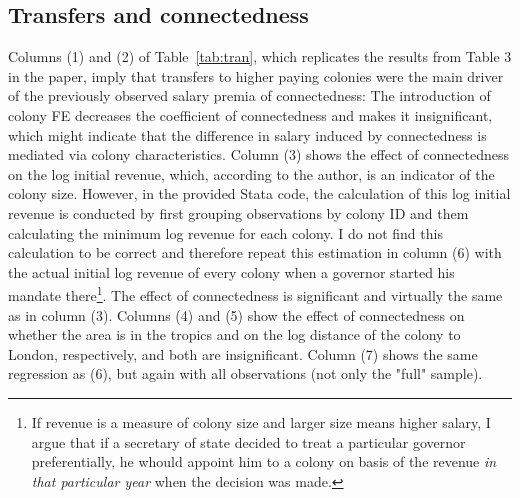 \documentclass[a4paper]{article}\usepackage[]{graphicx}\usepackage[]{xcolor}
\begin{document}
\subsection{Transfers and connectedness}
\hspace*{5mm} Columns (1) and (2) of Table~\ref{tab:tran}, which replicates the results from Table 3 in the paper, imply that transfers to higher paying colonies were the main driver of the previously observed salary premia of connectedness: The introduction of colony FE decreases the coefficient of connectedness and makes it insignificant, which might indicate that the difference in salary induced by connectedness is mediated via colony characteristics. Column (3) shows the effect of connectedness on the log initial revenue, which, according to the author, is an indicator of the colony size. However, in the provided Stata code, the calculation of this log initial revenue is conducted by first grouping observations by colony ID and them calculating the minimum log revenue for each colony. I do not find this calculation to be correct and therefore repeat this estimation in column (6) with the actual initial log revenue of every colony when a governor started his mandate there\footnote{If revenue is a measure of colony size and larger size means higher salary, I argue that if a secretary of state decided to treat a particular governor preferentially, he whould appoint him to a colony on basis of the revenue \textit{in that particular year} when the decision was made.}. The effect of connectedness is significant and virtually the same as in column (3). Columns (4) and (5) show the effect of connectedness on whether the area is in the tropics and on the log distance of the colony to London, respectively, and both are insignificant. Column (7) shows the same regression as (6), but again with all observations (not only the "full" sample).
\end{document}
